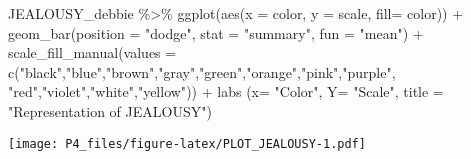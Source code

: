 \documentclass[
]{article}
\newenvironment{Shaded}{\begin{snugshade}}{\end{snugshade}}
\newcommand{\AttributeTok}[1]{\textcolor[rgb]{0.77,0.63,0.00}{#1}}
\newcommand{\FunctionTok}[1]{\textcolor[rgb]{0.00,0.00,0.00}{#1}}
\newcommand{\NormalTok}[1]{#1}
\newcommand{\SpecialCharTok}[1]{\textcolor[rgb]{0.00,0.00,0.00}{#1}}
\newcommand{\StringTok}[1]{\textcolor[rgb]{0.31,0.60,0.02}{#1}}
\begin{document}
\begin{Shaded}
\begin{Highlighting}[]
\NormalTok{JEALOUSY\_debbie }\SpecialCharTok{\%\textgreater{}\%}
  \FunctionTok{ggplot}\NormalTok{(}\FunctionTok{aes}\NormalTok{(}\AttributeTok{x =}\NormalTok{ color, }\AttributeTok{y =}\NormalTok{ scale, }\AttributeTok{fill=}\NormalTok{ color)) }\SpecialCharTok{+}
  \FunctionTok{geom\_bar}\NormalTok{(}\AttributeTok{position =} \StringTok{"dodge"}\NormalTok{, }\AttributeTok{stat =} \StringTok{"summary"}\NormalTok{, }\AttributeTok{fun =} \StringTok{"mean"}\NormalTok{) }\SpecialCharTok{+} \FunctionTok{scale\_fill\_manual}\NormalTok{(}\AttributeTok{values =} \FunctionTok{c}\NormalTok{(}\StringTok{"black"}\NormalTok{,}\StringTok{"blue"}\NormalTok{,}\StringTok{"brown"}\NormalTok{,}\StringTok{"gray"}\NormalTok{,}\StringTok{"green"}\NormalTok{,}\StringTok{"orange"}\NormalTok{,}\StringTok{"pink"}\NormalTok{,}\StringTok{"purple"}\NormalTok{, }\StringTok{"red"}\NormalTok{,}\StringTok{"violet"}\NormalTok{,}\StringTok{"white"}\NormalTok{,}\StringTok{"yellow"}\NormalTok{)) }\SpecialCharTok{+} \FunctionTok{labs}\NormalTok{ (}\AttributeTok{x=} \StringTok{"Color"}\NormalTok{, }\AttributeTok{Y=} \StringTok{"Scale"}\NormalTok{, }\AttributeTok{title =} \StringTok{"Representation of JEALOUSY"}\NormalTok{)}
\end{Highlighting}
\end{Shaded}

\texttt{[image: P4\_files/figure-latex/PLOT\_JEALOUSY-1.pdf]}
\end{document}
